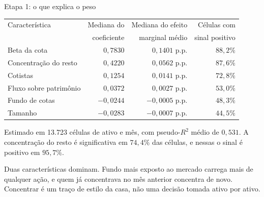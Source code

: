 \documentclass[aspectratio=169,11pt]{beamer}
\begin{document}
\begin{frame}{Etapa 1: o que explica o peso}

\centering
\small
\begin{tabular}{@{}lrrr@{}}
\toprule
Característica & Mediana do & Mediana do efeito & Células com \\
 & coeficiente & marginal médio & sinal positivo \\
\midrule
Beta da cota & $0{,}7830$ & $0{,}1401$ p.p. & $88{,}2\%$ \\
Concentração do resto & $0{,}4220$ & $0{,}0562$ p.p. & $87{,}6\%$ \\
Cotistas & $0{,}1254$ & $0{,}0141$ p.p. & $72{,}8\%$ \\
Fluxo sobre patrimônio & $0{,}0372$ & $0{,}0027$ p.p. & $53{,}0\%$ \\
Fundo de cotas & $-0{,}0244$ & $-0{,}0005$ p.p. & $48{,}3\%$ \\
Tamanho & $-0{,}0283$ & $-0{,}0007$ p.p. & $44{,}5\%$ \\
\bottomrule
\end{tabular}

\vspace{1.0em}
\raggedright
\normalsize
Estimado em 13.723 células de ativo e mês, com pseudo-$R^2$ médio de $0{,}531$. A
concentração do resto é significativa em $74{,}4\%$ das células, e nessas o sinal é positivo
em $95{,}7\%$.

\vspace{0.5em}
Duas características dominam. Fundo mais exposto ao mercado carrega mais de qualquer ação, e
quem já concentrava no mês anterior concentra de novo. Concentrar é um traço de estilo da
casa, não uma decisão tomada ativo por ativo.

\end{frame}
\end{document}
